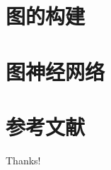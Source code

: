 \documentclass{beamer}
\begin{document}
\begin{frame}

\end{frame}

\section{图的构建}

\begin{frame}

\end{frame}

\section{图神经网络}

\begin{frame}

\end{frame}

\section{参考文献}

\begin{frame}[allowframebreaks]
    
    
\end{frame}

\begin{frame}
    \begin{center}
        {\Huge\calligra Thanks!}
    \end{center}
\end{frame}
\end{document}
